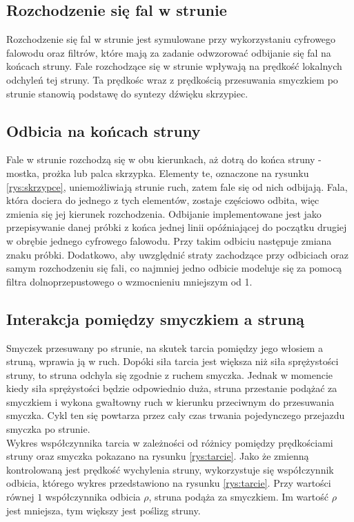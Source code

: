 \subsection{Rozchodzenie się fal w strunie}
Rozchodzenie się fal w strunie jest symulowane przy wykorzystaniu cyfrowego falowodu oraz filtrów, które mają za zadanie odwzorować odbijanie się fal na końcach struny. Fale rozchodzące się w strunie wpływają na prędkość lokalnych odchyleń tej struny. Ta prędkośc wraz z prędkością przesuwania smyczkiem po strunie stanowią podstawę do syntezy dźwięku skrzypiec.


\subsection{Odbicia na końcach struny}
Fale w strunie rozchodzą się w obu kierunkach, aż dotrą do końca struny - mostka, prożka lub palca skrzypka. Elementy te, oznaczone na rysunku \ref{rys:skrzypce}, uniemożliwiają strunie ruch, zatem fale się od nich odbijają. Fala, która dociera do jednego z tych elementów, zostaje częściowo odbita, więc zmienia się jej kierunek rozchodzenia. Odbijanie implementowane jest jako przepisywanie danej próbki z końca jednej linii opóźniającej do początku drugiej w obrębie jednego cyfrowego falowodu. Przy takim odbiciu następuje zmiana znaku próbki.
Dodatkowo, aby uwzględnić straty zachodzące przy odbiciach oraz samym rozchodzeniu się fali, co najmniej jedno odbicie modeluje się za pomocą filtra dolnoprzepustowego o wzmocnieniu mniejszym od 1.


\subsection{Interakcja pomiędzy smyczkiem a struną}
Smyczek przesuwany po strunie, na skutek tarcia pomiędzy jego włosiem a struną, wprawia ją w ruch. Dopóki siła tarcia jest większa niż siła sprężystości struny, to struna odchyla się zgodnie z ruchem smyczka. Jednak w momencie kiedy siła sprężystości będzie odpowiednio duża, struna przestanie podążać za smyczkiem i wykona gwałtowny ruch w kierunku przeciwnym do przesuwania smyczka.  Cykl ten się powtarza przez cały czas trwania pojedynczego przejazdu smyczka po strunie.  \\
Wykres współczynnika tarcia w zależności od różnicy pomiędzy prędkościami struny oraz smyczka pokazano na rysunku \ref{rys:tarcie}. Jako że zmienną kontrolowaną jest prędkość wychylenia struny, wykorzystuje się współczynnik odbicia, którego wykres przedstawiono na rysunku \ref{rys:tarcie}. Przy wartości równej $1$ współczynnika odbicia $\rho$, struna podąża za smyczkiem. Im wartość $\rho$ jest mniejsza, tym większy jest poślizg struny.


